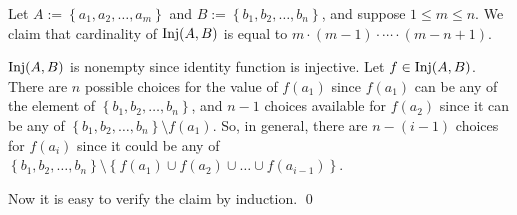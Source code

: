 \documentclass[a4paper,12pt]{article}
\begin{document}
\begin{rem}\label{note:number_inj}
	Let
	\(A:= \left\{ a_1,a_2,\dots,a_m \right\}\)
	and
	\(B:= \left\{ b_1,b_2,\dots,b_n \right\}\),
	and suppose
	\( 1 \le m \le n \).
	We claim that cardinality of \( \mathrm{Inj}(A,B) \) is equal to
	\( m \cdot (m-1) \cdot \cdots \cdot(m-n+1) \).
	
	\( \mathrm{Inj}(A,B) \) is nonempty
	since identity function is injective.
	Let \( f \in \mathrm{Inj}(A,B) \).
	There are \( n \) possible choices for the value of \( f(a_1) \)
	since \( f(a_1) \) can be any of the element of \( \left\{ b_1,b_2,\dots,b_n \right\} \),
	and
	\( n-1 \) choices available for \( f(a_2) \)
	since it can be any of
	\( \left\{ b_1,b_2,\dots,b_n \right\} \setminus f(a_1) \).
	So, in general, there are \( n-(i-1) \) choices for \( f(a_i) \)
	since it could be any of
	\( \left\{ b_1,b_2,\dots,b_n \right\}
	\setminus
	\left\{ f(a_1) \cup f(a_2) \cup \dots \cup f(a_{i-1}) \right\}
	\).
	
	Now it is easy to verify the claim by induction.
	\qed\end{rem}
\end{document}
